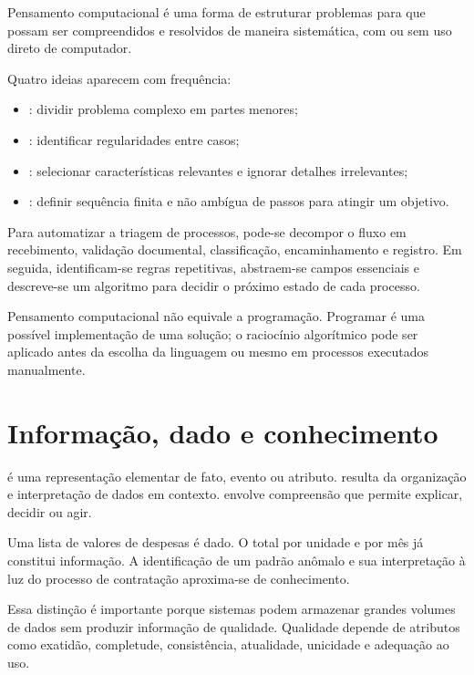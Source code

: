 Pensamento computacional é uma forma de estruturar problemas para que possam ser compreendidos e resolvidos de maneira sistemática, com ou sem uso direto de computador.

Quatro ideias aparecem com frequência:
\begin{itemize}
\item {}: dividir problema complexo em partes menores;
\item {}: identificar regularidades entre casos;
\item {}: selecionar características relevantes e ignorar detalhes irrelevantes;
\item {}: definir sequência finita e não ambígua de passos para atingir um objetivo.
\end{itemize}

\begin{exemplo}
Para automatizar a triagem de processos, pode-se decompor o fluxo em recebimento, validação documental, classificação, encaminhamento e registro. Em seguida, identificam-se regras repetitivas, abstraem-se campos essenciais e descreve-se um algoritmo para decidir o próximo estado de cada processo.
\end{exemplo}

Pensamento computacional não equivale a programação. Programar é uma possível implementação de uma solução; o raciocínio algorítmico pode ser aplicado antes da escolha da linguagem ou mesmo em processos executados manualmente.

\section{Informação, dado e conhecimento}

 é uma representação elementar de fato, evento ou atributo.  resulta da organização e interpretação de dados em contexto.  envolve compreensão que permite explicar, decidir ou agir.

Uma lista de valores de despesas é dado. O total por unidade e por mês já constitui informação. A identificação de um padrão anômalo e sua interpretação à luz do processo de contratação aproxima-se de conhecimento.

Essa distinção é importante porque sistemas podem armazenar grandes volumes de dados sem produzir informação de qualidade. Qualidade depende de atributos como exatidão, completude, consistência, atualidade, unicidade e adequação ao uso.

